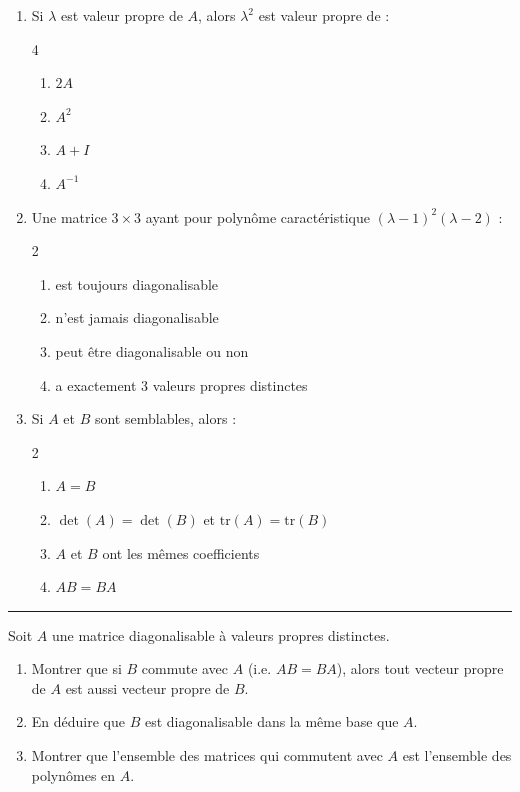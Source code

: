 \documentclass[../PolyS4.tex]{subfiles}
\begin{document}
\begin{enumerate}
\item Si $\lambda$ est valeur propre de $A$, alors $\lambda^2$ est valeur propre de :
\begin{multicols}{4}
\begin{enumerate}[label=\alph*.]
    \item $2A$
    \item $A^2$
    \item $A + I$
    \item $A^{-1}$
\end{enumerate}
\end{multicols}

\item Une matrice $3 \times 3$ ayant pour polynôme caractéristique $(\lambda - 1)^2(\lambda - 2)$ :
\begin{multicols}{2}
\begin{enumerate}[label=\alph*.]
    \item est toujours diagonalisable
    \item n'est jamais diagonalisable
    \item peut être diagonalisable ou non
    \item a exactement 3 valeurs propres distinctes
\end{enumerate}
\end{multicols}

\item Si $A$ et $B$ sont semblables, alors :
\begin{multicols}{2}
\begin{enumerate}[label=\alph*.]
    \item $A = B$
    \item $\det(A) = \det(B)$ et $\mathrm{tr}(A) = \mathrm{tr}(B)$
    \item $A$ et $B$ ont les mêmes coefficients
    \item $AB = BA$
\end{enumerate}
\end{multicols}
\end{enumerate}

\vspace{1em}
\hrule
\vspace{1em}


Soit $A$ une matrice diagonalisable à valeurs propres distinctes.
\begin{enumerate}
    \item Montrer que si $B$ commute avec $A$ (i.e. $AB = BA$), alors tout vecteur propre de $A$ est aussi vecteur propre de $B$.
    \item En déduire que $B$ est diagonalisable dans la même base que $A$.
    \item Montrer que l'ensemble des matrices qui commutent avec $A$ est l'ensemble des polynômes en $A$.
\end{enumerate}
\end{document}

